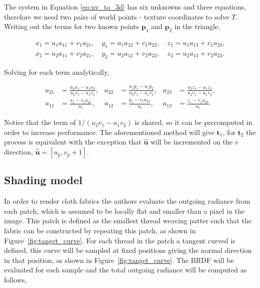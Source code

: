 \documentclass[12pt]{article}
\newcommand{\tb}{\mathbf{t}}
\begin{document}
The system in Equation \ref{eq:uv_to_3d} has six unknowns and three equations, therefore we need two pairs of world points - texture coordinates to solve $T$.
Writing out the terms for two known points $\mathbf{p}_1$ and $\mathbf{p}_2$ in the triangle,

\begin{equation}
\begin{split}
x_1 = u_1 a_{11} + v_1 a_{21}, \quad y_1 = u_1 a_{12} + v_1 a_{22}, \quad z_1 = u_1 a_{13} + v_1 a_{23},\\
x_2 = u_2 a_{11} + v_2 a_{21}, \quad y_2 = u_2 a_{12} + v_2 a_{22}, \quad z_2 = u_2 a_{13} + v_2 a_{23}.
\end{split}
\end{equation}

Solving for each term analytically,

\begin{align}
a_{21}& = \frac{u_2 x_1 - u_1 x_2}{u_2 v_1 - u_1 v_2},& a_{22}& = \frac{u_2 y_1 - u_1 y_2}{u_2 v_1 - u_1 v_2},& a_{23}& = \frac{u_2 z_1 - u_1 z_2}{u_2 v_1 - u_1 v_2}, \\
a_{11}& = \frac{x_1 - v_1 a_{21}}{u_1},& a_{12}& = \frac{y_1 - v_1 a_{22}}{u_1},&  a_{13}& = \frac{z_1 - v_1 a_{23}}{u_1}.
\end{align}

Notice that the term of $1/(u_2 v_1 - u_1 v_2)$ is shared, so it can be precomputed in order to increase performance.
The aforementioned method will give $\tb_1$, for $\tb_2$ the process is equivalent with the exception that $\hat{\mathbf{u}}$ will be incremented on the $v$ direction, $\hat{\mathbf{u}} = \left[ u_p, v_p + 1\right]$.

\subsection{Shading model}
\label{sec:shading_model}

In order to render cloth fabrics the authors evaluate the outgoing radiance from each patch, which is assumed to be locally flat and smaller than a pixel in the image.
This patch is defined as the smallest thread weaving patter such that the fabric can be constructed by repeating this patch, as shown in Figure~\ref{fig:tanget_curve}.
For each thread in the patch a tangent curved is defined, this curve will be sampled at fixed positions giving the normal direction in that position, as shown in Figure~\ref{fig:tanget_curve}.
The BRDF will be evaluated for each sample and the total outgoing radiance will be computed as follows,
\end{document}
